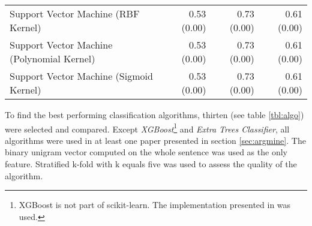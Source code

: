 \begin{table}[!h]
\begin{tabularx}{\textwidth}{Xrrr}
Support Vector Machine (RBF Kernel) 	&	 0.53 \scriptsize{(0.00)} &	 0.73 \scriptsize{(0.00)} &	 0.61 \scriptsize{(0.00)}  \\ 

Support Vector Machine (Polynomial Kernel) 	&	 0.53 \scriptsize{(0.00)} &	 0.73 \scriptsize{(0.00)} &	 0.61 \scriptsize{(0.00)}  \\

Support Vector Machine (Sigmoid Kernel) &	 0.53 \scriptsize{(0.00)} &	 0.73 \scriptsize{(0.00)} &	 0.61 \scriptsize{(0.00)}  \\ 


\bottomrule
\end{tabularx}
\end{table}

To find the best performing classification algorithms, thirten (see table \ref{tbl:algo}) were selected and compared. Except \emph{XGBoost}\footnote{XGBoost is not part of scikit-learn. The implementation presented in \cite{DBLP:journals/corr/ChenG16} was used.} and \emph{Extra Trees Classifier}, all algorithms were used in at least one paper presented in section \ref{sec:argmine}. The binary unigram vector computed on the whole sentence was used as the only feature. Stratified k-fold with k equals five was used to assess the quality of the algorithm.





